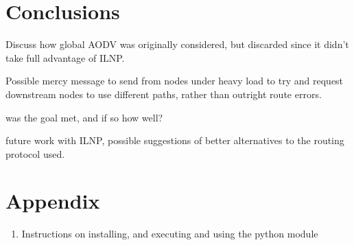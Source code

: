 \documentclass[12pt]{article}
\begin{document}
\pagebreak
\part{Conclusions}

Discuss how global AODV was originally considered, but discarded since it didn't take full advantage of ILNP.

Possible mercy message to send from nodes under heavy load to try and request downstream nodes to use different paths, rather than outright route errors.

was the goal met, and if so how well?

future work with ILNP, possible suggestions of better alternatives to the routing protocol used.

\pagebreak
\part{Appendix}
\begin{enumerate}
\item Instructions on installing, and executing and using the python module
\end{enumerate}



\end{document}
